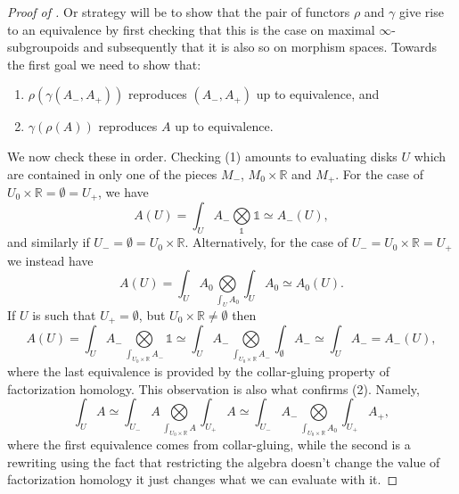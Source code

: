 \documentclass[../text]{subfiles}
\begin{document}
\begin{proof}[Proof of ]
    Or strategy will be to show that the pair of functors $\rho$ and $\gamma$ give rise to an equivalence by first checking that this is the case on maximal $\infty$-subgroupoids and subsequently that it is also so on morphism spaces. Towards the first goal we need to show that:
    \begin{enumerate}
        \item $\rho( \gamma (A_-, A_+))$ reproduces $(A_-, A_+)$ up to equivalence, and
        \item $\gamma (\rho (A))$ reproduces $A$ up to equivalence.
    \end{enumerate}
    We now check these in order. Checking (1) amounts to evaluating disks $U$ which are contained in only one of the pieces $M_-$, $M_0 \times \mathbb{R}$ and $M_+$. For the case of $U_0 \times \mathbb{R} = \emptyset = U_+$, we have
    \begin{equation}
        A(U) = \int_{U} A_- \bigotimes\limits_{\mathbb{1}} \mathbb{1} \simeq A_- (U),
    \end{equation}
    and similarly if $U_- = \emptyset = U_0 \times \mathbb{R}$. Alternatively, for the case of $U_- = U_0 \times \mathbb{R} = U_+$ we instead have
    \begin{equation}
        A(U) = \int_U A_0 \bigotimes\limits_{\int_{U} A_0} \int_U A_0 \simeq A_0(U).
    \end{equation}
    If $U$ is such that $U_+ = \emptyset$, but $U_0 \times \mathbb{R} \neq \emptyset$ then
    \begin{equation}
        A(U) = \int_U A_- \bigotimes\limits_{\int_{U_0 \times \mathbb{R}} A_-} \mathbb{1} \simeq \int_U A_- \bigotimes\limits_{\int_{U_0 \times \mathbb{R}} A_-} \int_{\emptyset} A_- \simeq \int_{U} A_- = A_-(U),
    \end{equation}
    where the last equivalence is provided by the collar-gluing property of factorization homology. This observation is also what confirms (2). Namely,
    \begin{equation}
        \int_U A \simeq \int_{U_-} A \bigotimes\limits_{\int_{U_0 \times \mathbb{R}} A} \int_{U_+} A \simeq \int_{U_-} A_- \bigotimes\limits_{\int_{U_0 \times \mathbb{R}} A_0} \int_{U_+} A_+,
    \end{equation}
    where the first equivalence comes from collar-gluing, while the second is a rewriting using the fact that restricting the algebra doesn't change the value of factorization homology it just changes what we can evaluate with it.


\end{proof}
\end{document}
